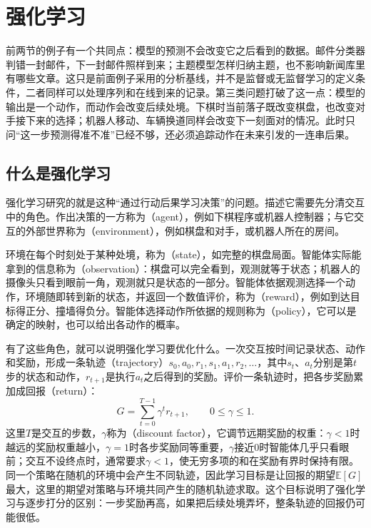 \FloatBarrier
\section{强化学习}
\label{sec:reinforcement-learning}

前两节的例子有一个共同点：模型的预测不会改变它之后看到的数据。邮件分类器判错一封邮件，下一封邮件照样到来；主题模型怎样归纳主题，也不影响新闻库里有哪些文章。这只是前面例子采用的分析基线，并不是监督或无监督学习的定义条件，二者同样可以处理序列和在线到来的记录。第三类问题打破了这一点：模型的输出是一个动作，而动作会改变后续处境。下棋时当前落子既改变棋盘，也改变对手接下来的选择；机器人移动、车辆换道同样会改变下一刻面对的情况。此时只问“这一步预测得准不准”已经不够，还必须追踪动作在未来引发的一连串后果。

\subsection{什么是强化学习}

强化学习研究的就是这种“通过行动后果学习决策”的问题。描述它需要先分清交互中的角色。作出决策的一方称为（agent），例如下棋程序或机器人控制器；与它交互的外部世界称为（environment），例如棋盘和对手，或机器人所在的房间。

环境在每个时刻处于某种处境，称为（state），如完整的棋盘局面。智能体实际能拿到的信息称为（observation）：棋盘可以完全看到，观测就等于状态；机器人的摄像头只看到眼前一角，观测就只是状态的一部分。智能体依据观测选择一个动作，环境随即转到新的状态，并返回一个数值评价，称为（reward），例如到达目标得正分、撞墙得负分。智能体选择动作所依据的规则称为（policy），它可以是确定的映射，也可以给出各动作的概率。

有了这些角色，就可以说明强化学习要优化什么。一次交互按时间记录状态、动作和奖励，形成一条轨迹（trajectory）$s_0,a_0,r_1,s_1,a_1,r_2,\ldots$，其中$s_t$、$a_t$分别是第$t$步的状态和动作，$r_{t+1}$是执行$a_t$之后得到的奖励。评价一条轨迹时，把各步奖励累加成回报（return）：
\begin{equation}
  G=\sum_{t=0}^{T-1}\gamma^{t}r_{t+1},\qquad 0\leq\gamma\leq 1.
  \label{eq:rl-return-overview}
\end{equation}
这里$T$是交互的步数，$\gamma$称为（discount factor），它调节远期奖励的权重：$\gamma<1$时越远的奖励权重越小，$\gamma=1$时各步奖励同等重要，$\gamma$接近0时智能体几乎只看眼前；交互不设终点时，通常要求$\gamma<1$，使无穷多项的和在奖励有界时保持有限。同一个策略在随机的环境中会产生不同轨迹，因此学习目标是让回报的期望$\mathbb{E}[G]$最大，这里的期望对策略与环境共同产生的随机轨迹求取。这个目标说明了强化学习与逐步打分的区别：一步奖励再高，如果把后续处境弄坏，整条轨迹的回报仍可能很低。

